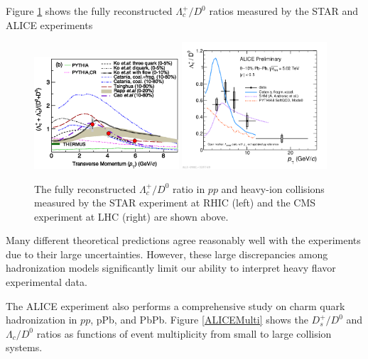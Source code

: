 Figure \ref{HadroPlotCharm} shows the fully reconstructed $\Lambda_c^+/D^0$ ratios measured by the STAR and ALICE experiments



\begin{figure}[hbtp]
\begin{center}
\includegraphics[width=0.48\textwidth]{Figures/Chapter2/STARLambdaCD0.png}
\includegraphics[width=0.48\textwidth]{Figures/Chapter2/ALICELambdaCD0}
\caption{The fully reconstructed $\Lambda_c^+/D^0$ ratio in $pp$ and heavy-ion collisions measured by the STAR experiment at RHIC (left) and the CMS experiment at LHC (right) are shown above.}
\label{HadroPlotCharm}
\end{center}
\end{figure}   



Many different theoretical predictions agree reasonably well with the experiments due to their large uncertainties. However, these large discrepancies among hadronization models significantly limit our ability to interpret heavy flavor experimental data. 

The ALICE experiment also performs a comprehensive study on charm quark hadronization in $pp$, pPb, and PbPb. Figure \ref{ALICEMulti} shows the $D^+_s/D^0$ and $\Lambda_c/D^0$ ratios as functions of event multiplicity from small to large collision systems. 


